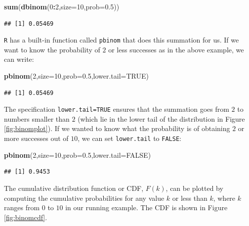 \documentclass[12pt,]{krantz}
\newenvironment{Shaded}{\begin{snugshade}}{\end{snugshade}}
\newcommand{\DataTypeTok}[1]{\textcolor[rgb]{0.13,0.29,0.53}{#1}}
\newcommand{\DecValTok}[1]{\textcolor[rgb]{0.00,0.00,0.81}{#1}}
\newcommand{\FloatTok}[1]{\textcolor[rgb]{0.00,0.00,0.81}{#1}}
\newcommand{\KeywordTok}[1]{\textcolor[rgb]{0.13,0.29,0.53}{\textbf{#1}}}
\newcommand{\NormalTok}[1]{#1}
\newcommand{\OperatorTok}[1]{\textcolor[rgb]{0.81,0.36,0.00}{\textbf{#1}}}
\newcommand{\OtherTok}[1]{\textcolor[rgb]{0.56,0.35,0.01}{#1}}
\begin{document}
\begin{Shaded}
\begin{Highlighting}[]
\KeywordTok{sum}\NormalTok{(}\KeywordTok{dbinom}\NormalTok{(}\DecValTok{0}\OperatorTok{:}\DecValTok{2}\NormalTok{,}\DataTypeTok{size=}\DecValTok{10}\NormalTok{,}\DataTypeTok{prob=}\FloatTok{0.5}\NormalTok{))}
\end{Highlighting}
\end{Shaded}

\begin{verbatim}
## [1] 0.05469
\end{verbatim}

\texttt{R} has a built-in function called \texttt{pbinom} that does this summation for us. If we want to know the probability of \(2\) or less successes as in the above example, we can write:

\begin{Shaded}
\begin{Highlighting}[]
\KeywordTok{pbinom}\NormalTok{(}\DecValTok{2}\NormalTok{,}\DataTypeTok{size=}\DecValTok{10}\NormalTok{,}\DataTypeTok{prob=}\FloatTok{0.5}\NormalTok{,}\DataTypeTok{lower.tail=}\OtherTok{TRUE}\NormalTok{)}
\end{Highlighting}
\end{Shaded}

\begin{verbatim}
## [1] 0.05469
\end{verbatim}

The specification \texttt{lower.tail=TRUE} ensures that the summation goes from \(2\) to numbers smaller than \(2\) (which lie in the lower tail of the distribution in Figure \ref{fig:binomplot}). If we wanted to know what the probability is of obtaining \(2\) or more successes out of \(10\), we can set \texttt{lower.tail} to \texttt{FALSE}:

\begin{Shaded}
\begin{Highlighting}[]
\KeywordTok{pbinom}\NormalTok{(}\DecValTok{2}\NormalTok{,}\DataTypeTok{size=}\DecValTok{10}\NormalTok{,}\DataTypeTok{prob=}\FloatTok{0.5}\NormalTok{,}\DataTypeTok{lower.tail=}\OtherTok{FALSE}\NormalTok{)}
\end{Highlighting}
\end{Shaded}

\begin{verbatim}
## [1] 0.9453
\end{verbatim}

The cumulative distribution function or CDF, \(F(k)\), can be plotted by computing the cumulative probabilities for any value \(k\) or less than \(k\), where \(k\) ranges from \(0\) to \(10\) in our running example. The CDF is shown in Figure \ref{fig:binomcdf}.
\end{document}
